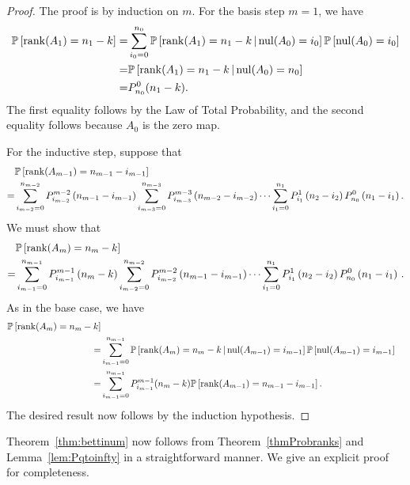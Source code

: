 \begin{proof}
The proof is by induction on $m$. For the basis step $m=1$, we have
\begin{align*}
\mathbb{P}\left[\operatorname{\mathrm{rank}}(A_1) = n_1 - k\right]
	=& \sum_{i_0=0}^{n_0}\mathbb{P}\left [\operatorname{\mathrm{rank}}(A_1)= n_1 - k\,|\,\mathrm{nul} (A_0) = i_0\right]
		\mathbb{P}\left[\mathrm{nul}(A_0) = i_0 \right]\\
	=& \mathbb{P}\left [\operatorname{\mathrm{rank}}(A_1)= n_1 - k\,|\,\mathrm{nul} (A_0) = n_0\right]\\
	=& P_{n_0}^0(n_1 - k).
\end{align*}
The first equality follows by the Law of Total Probability, and the second equality follows because $A_0$ is the zero map.

For the inductive step, suppose that
\begin{align*}
 &  \mathbb{P}\left[\operatorname{\mathrm{rank}}(A_{m-1}) = n_{m-1} - i_{m-1}\right]\\
=& 	\sum_{i_{m-2}=0}^{n_{m-2}} P_{i_{m-2}}^{m-2}\left(n_{m-1} -i_{m-1}\right)
	\sum_{i_{m-3}=0}^{n_{m-3}} P_{i_{m-3}}^{m-3}\left(n_{m-2} - i_{m-2}\right)
		\cdots
	\sum_{i_1 = 0}^{n_1} P_{i_1}^1\left(n_2 - i_2\right) P_{n_0}^0 \left(n_1 - i_1\right).
\end{align*}
We must show that
\begin{align*}
  &  \mathbb{P}\left[\operatorname{\mathrm{rank}}(A_{m}) = n_{m} - k\right]\\
  =& 	\sum_{i_{m-1}=0}^{n_{m-1}} P_{i_{m-1}}^{m-1}\left(n_{m} -k\right)
  \sum_{i_{m-2}=0}^{n_{m-2}} P_{i_{m-2}}^{m-2}\left(n_{m-1} - i_{m-1}\right)
  \cdots
  \sum_{i_1 = 0}^{n_1} P_{i_1}^1\left(n_2 - i_2\right) P_{n_0}^0 \left(n_1 - i_1\right) \, .
\end{align*}
As in the base case, we have 
\begin{align*}
  \mathbb{P}\left[\operatorname{\mathrm{rank}}(A_{m}) = n_{m} - k\right]\\
  =& 	\sum_{i_{m-1}=0}^{n_{m-1}} \mathbb{P}\left[ \operatorname{\mathrm{rank}}(A_{m}) = n_{m} - k  
  \,|\, \mathrm{nul}(A_{m-1}) = i_{m-1}\right] \mathbb{P}\left[\mathrm{nul}(A_{m-1}) = i_{m-1}\right]\\
  =&  \sum_{i_{m-1}=0}^{n_{m-1}} P_{i_{m-1}}^{m-1}(n_{m} - k)
  \mathbb{P}\left[\operatorname{\mathrm{rank}}(A_{m-1}) = n_{m-1}- i_{m-1}\right].
\end{align*}
The desired result now follows by the induction hypothesis.
\end{proof}

Theorem~\ref{thm:bettinum} now follows from Theorem~\ref{thmProbranks} and 
Lemma~\ref{lem:Pqtoinfty} in a straightforward manner. We give an explicit proof
for completeness.

